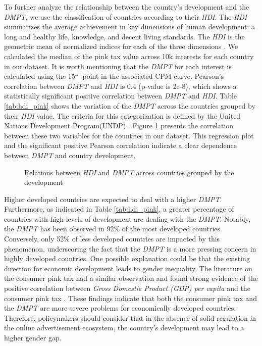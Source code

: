 \documentclass[twocolumn]{bmcart}\usepackage{lineno}
\begin{document}
To further analyze the relationship between the country's development and the \emph{DMPT}, we use the classification of countries according to their \emph{HDI}. The \emph{HDI} summarizes the average achievement in key dimensions of human development: a long and healthy life, knowledge, and decent living standards. The \emph{HDI} is the geometric mean of normalized indices for each of the three dimensions \cite{undp}. We calculated the median of the pink tax value across 10k interests for each country in our dataset. It is worth mentioning that the \emph{DMPT} for each interest is calculated using the 15$^{th}$ point in the associated CPM curve. Pearson's correlation between \emph{DMPT} and \emph{HDI} is \color{blue}0.4 (p-value is 2e-8), which shows a statistically significant positive correlation between \emph{DMPT} and \emph{HDI}\color{black}. Table \ref{tab:hdi_pink} shows the variation of the \emph{DMPT} across the countries grouped by their \emph{HDI} value. The criteria for this categorization is defined by the United Nations Development Program(UNDP) \cite{HDI}. \color{blue} Figure \ref{fig:HDIReg} presents the correlation between these two variables for the countries in our dataset. This regression plot and the significant positive Pearson correlation indicate a clear dependence between \emph{DMPT} and country development.\color{black}

\begin{figure}[h!]
\color{blue}
    \centering
\caption{Relations between \emph{HDI} and \emph{DMPT} across countries grouped by the development}
    \label{fig:HDIReg}
\end{figure}
\color{black}
Higher developed countries are expected to deal with a higher \emph{DMPT}. Furthermore, as indicated in Table \ref{tab:hdi_pink}, a greater percentage of countries with high levels of development are dealing with the \emph{DMPT}. Notably, the \emph{DMPT} has been observed in 92\% of the most developed countries. Conversely, only 52\% of less developed countries are impacted by this phenomenon, underscoring the fact that the \emph{DMPT} is a more pressing concern in highly developed countries. One possible explanation could be that the existing direction for economic development leads to gender inequality. \color{blue}The literature on the consumer pink tax had a similar observation and found strong evidence of the positive correlation between \emph{Gross Domestic Product (GDP) per capita} and the consumer pink tax \cite{betz2021women}. These findings indicate that both the consumer pink tax and the \emph{DMPT} are more severe problems for economically developed countries. Therefore, policymakers should consider that in the absence of solid regulation in the online advertisement ecosystem, the country's development may lead to a higher gender gap.\color{black}
\end{document}

